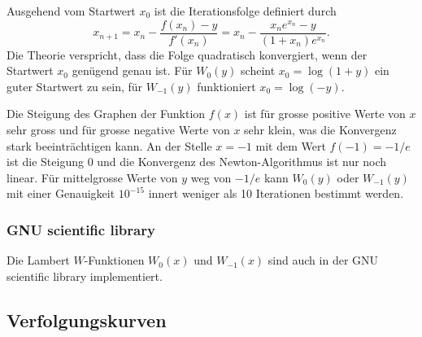 Ausgehend vom Startwert $x_0$ ist die Iterationsfolge definiert
durch
\[
x_{n+1}
=
x_n - \frac{f(x_n) - y}{f'(x_n)}
=
x_n - \frac{x_ne^{x_n}-y}{(1+x_n)e^{x_n}}.
\]
Die Theorie verspricht, dass die Folge quadratisch konvergiert, wenn
der Startwert $x_0$ genügend genau ist.
Für $W_0(y)$ scheint $x_0=\log(1+y)$ ein guter Startwert zu sein, für
$W_{-1}(y)$ funktioniert $x_0=\log(-y)$.

Die Steigung des Graphen der Funktion $f(x)$ ist für grosse positive
Werte von $x$ sehr gross und für grosse negative Werte von $x$ sehr
klein, was die Konvergenz stark beeinträchtigen kann.
An der Stelle $x=-1$ mit dem Wert $f(-1)=-1/e$ ist die Steigung $0$
und die Konvergenz des Newton-Algorithmus ist nur noch linear.
Für mittelgrosse Werte von $y$ weg von $-1/e$ kann $W_0(y)$ oder $W_{-1}(y)$ 
mit einer Genauigkeit $10^{-15}$ innert weniger als 10 Iterationen
bestimmt werden.

\subsubsection{GNU scientific library}
Die Lambert $W$-Funktionen $W_0(x)$ und $W_{-1}(x)$ sind auch in der
GNU scientific library \cite{buch:library:gsl} implementiert.

%
%
\subsection{Verfolgungskurven
\label{buch:subsection:verfolgungskurven}}








